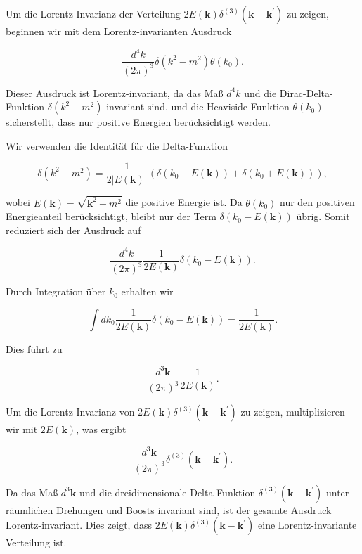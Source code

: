 Um die Lorentz-Invarianz der Verteilung $2 E(\mathbf{k}) \delta^{(3)}\left(\mathbf{k}-\mathbf{k}^{\prime}\right)$ zu zeigen, beginnen wir mit dem Lorentz-invarianten Ausdruck

\[
\frac{d^4 k}{(2 \pi)^3} \delta\left(k^2-m^2\right) \theta\left(k_0\right).
\]

Dieser Ausdruck ist Lorentz-invariant, da das Maß $d^4 k$ und die Dirac-Delta-Funktion $\delta\left(k^2-m^2\right)$ invariant sind, und die Heaviside-Funktion $\theta\left(k_0\right)$ sicherstellt, dass nur positive Energien berücksichtigt werden.

Wir verwenden die Identität für die Delta-Funktion

\[
\delta\left(k^2-m^2\right) = \frac{1}{2|E(\mathbf{k})|} \left( \delta\left(k_0 - E(\mathbf{k})\right) + \delta\left(k_0 + E(\mathbf{k})\right) \right),
\]

wobei $E(\mathbf{k}) = \sqrt{\mathbf{k}^2 + m^2}$ die positive Energie ist. Da $\theta(k_0)$ nur den positiven Energieanteil berücksichtigt, bleibt nur der Term $\delta\left(k_0 - E(\mathbf{k})\right)$ übrig. Somit reduziert sich der Ausdruck auf

\[
\frac{d^4 k}{(2 \pi)^3} \frac{1}{2 E(\mathbf{k})} \delta\left(k_0 - E(\mathbf{k})\right).
\]

Durch Integration über $k_0$ erhalten wir

\[
\int dk_0 \frac{1}{2 E(\mathbf{k})} \delta(k_0 - E(\mathbf{k})) = \frac{1}{2 E(\mathbf{k})}.
\]

Dies führt zu

\[
\frac{d^3 \mathbf{k}}{(2 \pi)^3} \frac{1}{2 E(\mathbf{k})}.
\]

Um die Lorentz-Invarianz von $2 E(\mathbf{k}) \delta^{(3)}\left(\mathbf{k}-\mathbf{k}^{\prime}\right)$ zu zeigen, multiplizieren wir mit $2 E(\mathbf{k})$, was ergibt

\[
\frac{d^3 \mathbf{k}}{(2 \pi)^3} \delta^{(3)}\left(\mathbf{k}-\mathbf{k}^{\prime}\right).
\]

Da das Maß $d^3 \mathbf{k}$ und die dreidimensionale Delta-Funktion $\delta^{(3)}\left(\mathbf{k}-\mathbf{k}^{\prime}\right)$ unter räumlichen Drehungen und Boosts invariant sind, ist der gesamte Ausdruck Lorentz-invariant. Dies zeigt, dass $2 E(\mathbf{k}) \delta^{(3)}\left(\mathbf{k}-\mathbf{k}^{\prime}\right)$ eine Lorentz-invariante Verteilung ist.

